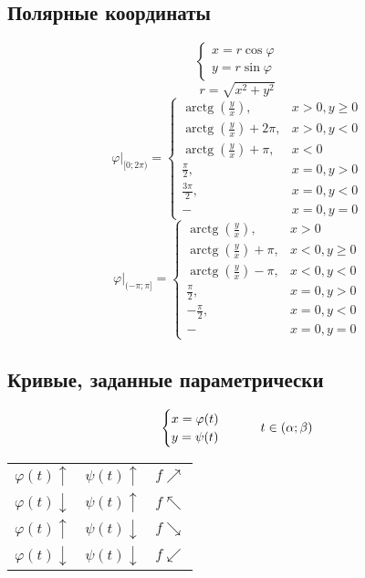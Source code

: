 \documentclass[main]{subfiles}
\begin{document}
    \subsection{Полярные координаты}
    \[\begin{cases}
      x = r\cos\varphi\\
      y = r\sin\varphi
    \end{cases}\]
    \[r = \sqrt{x^2 + y^2}\]
    \[\varphi \Big|_{[0;2\pi)} =
    \begin{cases}
        \operatorname{arctg}(\frac{y}{x}), &  x > 0, y \ge 0\\
        \operatorname{arctg}(\frac{y}{x}) + 2\pi, &  x > 0, y < 0 \\
        \operatorname{arctg}(\frac{y}{x}) + \pi, & x < 0\\
        \frac{\pi}{2}, &  x = 0,  y > 0\\
        \frac{3\pi}{2}, & x = 0,  y < 0\\
        - &  x = 0,  y = 0
    \end{cases}\]
    \[\varphi \Big|_{(-\pi;\pi]} =
    \begin{cases}
        \operatorname{arctg}(\frac{y}{x}), &  x > 0\\
        \operatorname{arctg}(\frac{y}{x}) + \pi, &  x < 0 , y \ge 0\\
        \operatorname{arctg}(\frac{y}{x}) - \pi, & x < 0, y < 0\\
        \frac{\pi}{2}, & x = 0,  y > 0\\
        -\frac{\pi}{2}, & x = 0,  y < 0\\
        - &  x = 0,  y = 0
    \end{cases}\]

    \subsection{Кривые, заданные параметрически}
    \begin{Utv}
        \[\begin{cases}
            x = \varphi(t)\\
            y = \psi(t)
        \end{cases} \qquad t \in (\alpha; \beta)\]

        \begin{tabular}{ccc}
          $\varphi(t) \uparrow$ & $\psi(t) \uparrow$ & $f\nearrow$\\
          $\varphi(t) \downarrow$ & $\psi(t) \uparrow$ & $f\nwarrow$\\
          $\varphi(t) \uparrow$ & $\psi(t) \downarrow$ & $f\searrow$\\
          $\varphi(t) \downarrow$ & $\psi(t) \downarrow$ & $f\swarrow$
        \end{tabular}
    \end{Utv}
\end{document}
